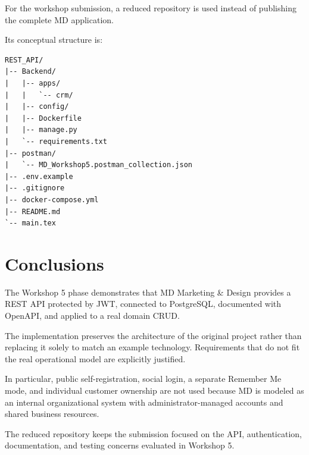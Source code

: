 \documentclass[11pt,a4paper]{article}
\begin{document}
For the workshop submission, a reduced repository is used instead of publishing the complete MD application.

Its conceptual structure is:

\begin{lstlisting}
REST_API/
|-- Backend/
|   |-- apps/
|   |   `-- crm/
|   |-- config/
|   |-- Dockerfile
|   |-- manage.py
|   `-- requirements.txt
|-- postman/
|   `-- MD_Workshop5.postman_collection.json
|-- .env.example
|-- .gitignore
|-- docker-compose.yml
|-- README.md
`-- main.tex
\end{lstlisting}


\section{Conclusions}

The Workshop 5 phase demonstrates that MD Marketing \& Design provides a REST API protected by JWT, connected to PostgreSQL, documented with OpenAPI, and applied to a real domain CRUD.

The implementation preserves the architecture of the original project rather than replacing it solely to match an example technology. Requirements that do not fit the real operational model are explicitly justified.

In particular, public self-registration, social login, a separate Remember Me mode, and individual customer ownership are not used because MD is modeled as an internal organizational system with administrator-managed accounts and shared business resources.

The reduced repository keeps the submission focused on the API, authentication, documentation, and testing concerns evaluated in Workshop 5.
\end{document}
